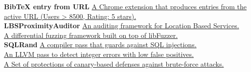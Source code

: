 
\begin{cvparagraph}

\textbf{BibTeX entry from URL} \hspace*{2pt} \href{https://chrome.google.com/webstore/detail/bibtex-entry-from-url/mgpmgkhhbjgkpnanlmlhibjfgpdpgjec} {A Chrome extension that produces  entries from the active URL (Users > 8500, Rating: 5 stars).}\\
\textbf{LBSProximityAuditor} \hspace*{7pt} \href{https://github.com/nettrino/LBSProximityAuditor}{An auditing framework for Location Based Services.}\\
\textbf{\nezha} \hspace*{69pt} \href{https://github.com/nezha-dt/nezha}
    {A differential fuzzing framework built on top of libFuzzer.}\\
\textbf{SQLRand} \hspace*{58pt}
\href{https://github.com/nettrino/SQLRand}{A compiler pass that guards against SQL injections.}\\
\textbf{\intflow} \hspace*{59pt} \href{https://github.com/nettrino/IntFlow}{An LLVM pass to detect integer errors with low false positives.}\\
\textbf{\dynaguard} \hspace*{46pt}
\href{https://github.com/nettrino/DynaGuard}{A Set of protections of canary-based defenses against brute-force attacks.}
\end{cvparagraph}
